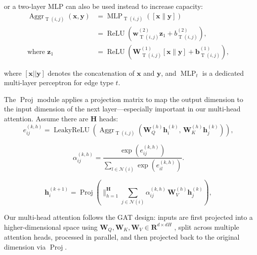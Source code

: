 \documentclass{article}
\theoremstyle{plain}
\theoremstyle{definition}
\theoremstyle{remark}
\begin{document}
or a two-layer MLP can also be used instead to increase capacity:
\begin{equation}
\begin{aligned}
\operatorname{Aggr}_{\operatorname{T}(i,j)}\left(\mathbf{x}, \mathbf{y}\right)
&= \operatorname{MLP}_{\operatorname{T}(i,j)}\!\left( [\mathbf{x} \| \mathbf{y}] \right) \\
&= \operatorname{ReLU}\left( \mathbf{w}^{(2)}_{\operatorname{T}(i,j)} \mathbf{z}_1 + b^{(2)}_{\operatorname{T}(i,j)} \right), \\
\text{where } \mathbf{z}_1 &= \operatorname{ReLU}\left( \mathbf{W}^{(1)}_{\operatorname{T}(i,j)} [\mathbf{x} \| \mathbf{y}] + \mathbf{b}^{(1)}_{\operatorname{T}(i,j)} \right),
\end{aligned}
\end{equation}

where  $[\mathbf{x}|| \mathbf{y}]$  denotes the concatenation of $\mathbf{x}$ and $\mathbf{y}$, and $\operatorname{MLP}_t$ is a dedicated multi-layer perceptron for edge type $t$.

The $\operatorname{Proj}$ module applies a projection matrix to map the output dimension to the input dimension of the next layer—especially important in our multi-head attention. Assume there are $\mathbf{H}$ heads:
\begin{equation}
e_{ij}^{(k,h)} = \operatorname{LeakyReLU}\left( \operatorname{Aggr}_{\operatorname{T}(i,j)}\left( \mathbf{W}_Q^{(h)} \mathbf{h}_i^{(k)},\, \mathbf{W}_K^{(h)} \mathbf{h}_j^{(k)} \right) \right),
\end{equation}

\begin{equation}
\alpha_{ij}^{(k,h)} = \frac{\exp\!\left(e_{ij}^{(k,h)}\right)}{\sum_{l \in \mathcal{N}(i)} \exp\!\left(e_{il}^{(k,h)}\right)}.
\end{equation}

\begin{equation}
\mathbf{h}_i^{(k+1)} = \operatorname{Proj}\left( \big\|_{h=1}^{\mathbf{H}} \sum_{j \in \mathcal{N}(i)} \alpha_{ij}^{(k,h)} \, \mathbf{W}_V^{(h)} \mathbf{h}_j^{(k)} \right),
\end{equation}

Our multi-head attention follows the GAT design: inputs are first projected into a higher-dimensional space using  $\mathbf{W}_Q,\mathbf{W}_K,\mathbf{W}_V \in \mathbf{R}^{d\times dH}$ , split across multiple attention heads, processed in parallel, and then projected back to the original dimension via $\operatorname{Proj}$. 
\end{document}
